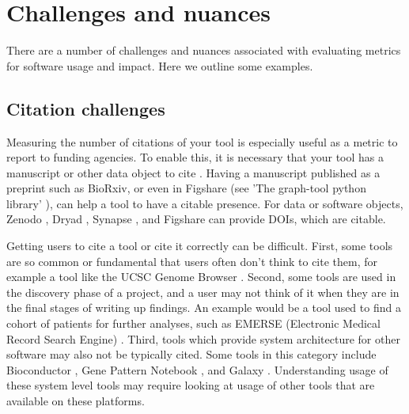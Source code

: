 \documentclass{article}
\begin{document}
\section{Challenges and nuances}

There are a number of challenges and nuances associated with evaluating metrics for software usage and impact. Here we outline some examples.

\subsection{Citation challenges}
Measuring the number of citations of your tool is especially useful as a metric to report to funding agencies. To enable this, it is necessary that your tool has a manuscript or other data object to cite \cite{chue_hong_software_2019}. Having a manuscript published as a preprint such as BioRxiv, or even in Figshare (see 'The graph-tool python library' \cite{peixoto_graph-tool_2017}), can help a tool to have a citable presence. For data or software objects, Zenodo \cite{zenodo}, Dryad \cite{datadryad}, Synapse \cite{synapse}, and Figshare \cite{figshare} can provide DOIs, which are citable. 

Getting users to cite a tool or cite it correctly can be difficult. First, some tools are so common or fundamental that users often don't think to cite them, for example a tool like the UCSC Genome Browser \cite{ucsc, kent_human_2002}. Second, some tools are used in the discovery phase of a project, and a user may not think of it when they are in the final stages of writing up findings. An example would be a tool used to find a cohort of patients for further analyses, such as EMERSE (Electronic Medical Record Search Engine) \cite{hanauer_supporting_2015}. Third, tools which provide system architecture for other software may also not be typically cited. Some tools in this category include Bioconductor \cite{bioconductor}, Gene Pattern Notebook \cite{reich_genepattern_2017}, and Galaxy \cite{the_galaxy_community_galaxy_2022}. Understanding usage of these system level tools may require looking at usage of other tools that are available on these platforms.
\end{document}
